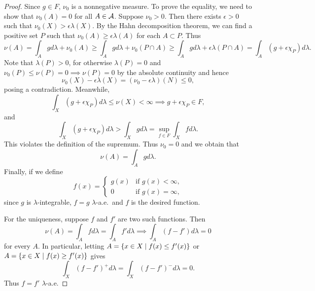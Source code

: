 \begin{proof}
    Since $g\in F$, $\nu_0$ is a nonnegative measure. To prove 
    the equality, we need to show that $\nu_0(A) = 0$ for all 
    $A\in\mathcal{A}$. Suppose $\nu_0 > 0$. Then there exists $\epsilon>0$ 
    such that $\nu_0(X)>\epsilon\lambda(X)$. By the Hahn decomposition 
    theorem, we can find a positive set $P$ such that 
    $\nu_0(A)\geq\epsilon\lambda(A)$ for each $A\subset P$. Thus 
    \begin{equation*}
        \nu(A) = \int_A gd\lambda + \nu_0(A) 
        \geq \int_A gd\lambda + \nu_0(P\cap A) 
        \geq \int_A gd\lambda + \epsilon\lambda(P\cap A) 
        = \int_A (g+\epsilon\chi_P)d\lambda.
    \end{equation*}
    Note that $\lambda(P)>0$, for otherwise $\lambda(P) = 0$ 
    and $\nu_0(P)\leq\nu(P) = 0\implies\nu(P) = 0$ by the 
    absolute continuity and hence 
    \begin{equation*}
        \nu_0(X) - \epsilon\lambda(X) = (\nu_0-\epsilon\lambda)(N) \leq 0,
    \end{equation*}
    posing a contradiction. Meanwhile, 
    \begin{equation*}
        \int_X (g+\epsilon\chi_P)d\lambda \leq \nu(X) < \infty 
        \implies g+\epsilon\chi_P\in F,
    \end{equation*}
    and 
    \begin{equation*}
        \int_X (g+\epsilon\chi_P)d\lambda > \int_X gd\lambda 
        = \sup_{f\in F}\int_X fd\lambda.
    \end{equation*}
    This violates the definition of the supremum. Thus $\nu_0 = 0$ 
    and we obtain that 
    \begin{equation*}
        \nu(A) = \int_A gd\lambda.
    \end{equation*}
    Finally, if we define 
    \begin{equation*}
        f(x) = \begin{cases}
            g(x) & \text{if } g(x) < \infty, \\
            0 & \text{if } g(x) = \infty,
        \end{cases}
    \end{equation*}
    since $g$ is $\lambda$-integrable, $f = g$ $\lambda$-a.e.\
    and $f$ is the desired function. 

    For the uniqueness, suppose $f$ and $f'$ are two such functions. 
    Then 
    \begin{equation*}
        \nu(A) = \int_A fd\lambda = \int_A f'd\lambda \implies 
        \int_A (f-f')d\lambda = 0
    \end{equation*}
    for every $A$. In particular, letting $A = \left\{ x\in X \;\middle\vert\; f(x)\leq f'(x) \right\}$ 
    or $A = \left\{ x\in X \;\middle\vert\; f(x)\geq f'(x) \right\}$ gives 
    \begin{equation*}
        \int_X (f-f')^+d\lambda = \int_X (f-f')^-d\lambda = 0.
    \end{equation*}
    Thus $f = f'$ $\lambda$-a.e. 


\end{proof}
